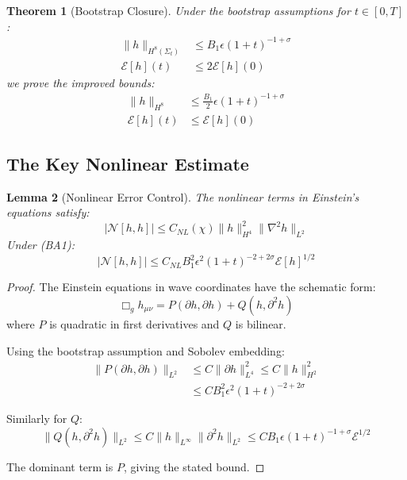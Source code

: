 \documentclass[12pt,a4paper]{article}
\newtheorem{theorem}{Theorem}[section]
\newtheorem{lemma}[theorem]{Lemma}
\begin{document}
\begin{theorem}[Bootstrap Closure]\label{thm:bootstrap}
Under the bootstrap assumptions for $t \in [0, T]$:
\begin{align}
\|h\|_{H^8(\Sigma_t)} &\leq B_1\epsilon(1+t)^{-1+\sigma} \tag{BA1} \\
\mathcal{E}[h](t) &\leq 2\mathcal{E}[h](0) \tag{BA2}
\end{align}
we prove the improved bounds:
\begin{align}
\|h\|_{H^8} &\leq \frac{B_1}{2}\epsilon(1+t)^{-1+\sigma} \tag{IBA1} \\
\mathcal{E}[h](t) &\leq \mathcal{E}[h](0) \tag{IBA2}
\end{align}
\end{theorem}

\subsection{The Key Nonlinear Estimate}

\begin{lemma}[Nonlinear Error Control]\label{lem:nonlinear}
The nonlinear terms in Einstein's equations satisfy:
\begin{equation}
|\mathcal{N}[h,h]| \leq C_{NL}(\chi)\|h\|_{H^4}^2 \|\nabla^2 h\|_{L^2}
\end{equation}
Under (BA1):
\begin{equation}
|\mathcal{N}[h,h]| \leq C_{NL}B_1^2\epsilon^2(1+t)^{-2+2\sigma}\mathcal{E}[h]^{1/2}
\end{equation}
\end{lemma}

\begin{proof}
The Einstein equations in wave coordinates have the schematic form:
\begin{equation}
\Box_g h_{\mu\nu} = P(\partial h, \partial h) + Q(h, \partial^2 h)
\end{equation}
where $P$ is quadratic in first derivatives and $Q$ is bilinear.

Using the bootstrap assumption and Sobolev embedding:
\begin{align}
\|P(\partial h, \partial h)\|_{L^2} &\leq C\|\partial h\|_{L^4}^2 \leq C\|h\|_{H^2}^2 \\
&\leq CB_1^2\epsilon^2(1+t)^{-2+2\sigma}
\end{align}

Similarly for $Q$:
\begin{equation}
\|Q(h,\partial^2 h)\|_{L^2} \leq C\|h\|_{L^\infty}\|\partial^2 h\|_{L^2} \leq CB_1\epsilon(1+t)^{-1+\sigma}\mathcal{E}^{1/2}
\end{equation}

The dominant term is $P$, giving the stated bound.
\end{proof}
\end{document}
